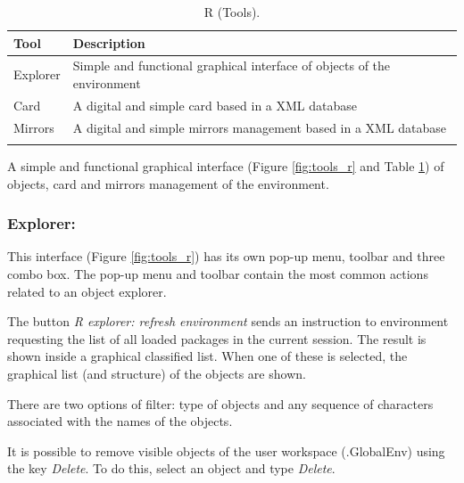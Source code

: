 \begin{table}
  \begin{footnotesize}
    \begin{tabularx}{\textwidth}{>{\hsize=0.3\hsize}X>{\hsize=0.7\hsize}X}\\
      \hline
      \textbf{Tool} & \textbf{Description} \\
      \hline
      Explorer & Simple and functional graphical interface of objects of the \RR{} environment \\
      Card & A digital and simple \RR{} card based in a XML database \\
      Mirrors & A digital and simple \RR{} mirrors management based in a XML database \\
      \hline
      \\
    \end{tabularx}
  \end{footnotesize}
  \caption{R (Tools).}
  \label{tab:tools_r}
\end{table}

A simple and functional graphical interface
(Figure \ref{fig:tools_r} and
Table \ref{tab:tools_r})
of objects, card and mirrors management of the \RR{} environment.


\subsubsection{Explorer:}

This interface
(Figure \ref{fig:tools_r})
has its own pop-up menu, toolbar and three combo box. The
pop-up menu and toolbar contain the most common actions related to an object
explorer.

The button \textit{R explorer: refresh environment} sends an instruction to
\RR{} environment requesting the list of all loaded packages in the current
session. The result is shown inside a graphical classified list. When one
of these is selected, the graphical list (and structure) of the objects
are shown.

There are two options of filter: type of objects and any sequence of
characters associated with the names of the objects.

It is possible to remove visible objects of the user workspace (.GlobalEnv)
using the key \textit{Delete}. To do this, select an object and type
\textit{Delete}.

